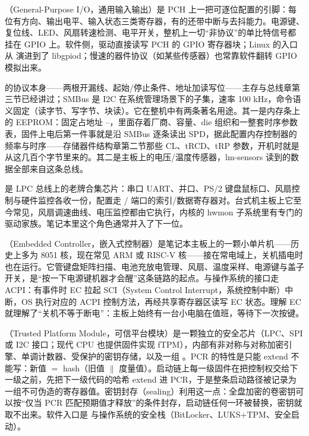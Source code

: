 （General-Purpose I/O，通用输入输出）是 PCH 上一把可逐位配置的引脚：每位有方向、输出电平、输入状态三类寄存器，有的还带中断与去抖能力。电源键、复位线、LED、风扇转速检测、电平开关，整机上一切“非协议”的单比特信号都挂在 GPIO 上。软件侧，驱动直接读写 PCH 的 GPIO 寄存器块；Linux 的入口从  演进到了 libgpiod；慢速的器件协议（如某些传感器）也常靠软件翻转 GPIO 模拟出来。

 的协议本身——两根开漏线、起始/停止条件、地址加读写位——主存与总线章第三节已经讲过；SMBus 是 I2C 在系统管理场景下的子集，速率 100 kHz，命令语义固定（读字节、写字节、块读）。它在整机中有两条著名用途。其一是内存条上的  EEPROM：固定占地址 --，里面存着厂商、容量、die 组织和一整套时序参数表，固件上电后第一件事就是沿 SMBus 逐条读出 SPD，据此配置内存控制器的频率与时序——存储器件结构章第二节那些 CL、tRCD、tRP 参数，开机时就是从这几百个字节里来的。其二是主板上的电压/温度传感器，lm-sensors 读到的数据全部来自这条总线。

 是 LPC 总线上的老牌合集芯片：串口 UART、并口、PS/2 键盘鼠标口、风扇控制与硬件监控各收一份，配置走 / 端口的索引/数据寄存器对。台式机主板上它至今常见，风扇调速曲线、电压监控都由它执行，内核的 hwmon 子系统里有专门的驱动家族。笔记本里这个角色通常并入了下一位。

（Embedded Controller，嵌入式控制器）是笔记本主板上的一颗小单片机——历史上多为 8051 核，现在常见 ARM 或 RISC-V 核——接在常电域上，关机插电时也在运行。它管键盘矩阵扫描、电池充放电管理、风扇、温度采样、电源键与盖子开关，是“按一下电源键机器才会醒”这条链路的起点。与操作系统的接口走 ACPI：有事件时 EC 拉起 SCI（System Control Interrupt，系统控制中断）中断，OS 执行对应的 ACPI 控制方法，再经共享寄存器区读写 EC 状态。理解 EC 就理解了“关机不等于断电”：主板上始终有一台小电脑在值班，等待下一次按键。

（Trusted Platform Module，可信平台模块）是一颗独立的安全芯片（LPC、SPI 或 I2C 接口；现代 CPU 也提供固件实现 fTPM），内部有非对称与对称加密引擎、单调计数器、受保护的密钥存储，以及一组 。PCR 的特性是只能 extend 不能写：新值 $=$ hash（旧值 $\|$ 度量值）。启动链上每一级固件在把控制权交给下一级之前，先把下一级代码的哈希 extend 进 PCR，于是整条启动路径被记录为一组不可伪造的寄存器值。密钥封存（sealing）利用这一点：全盘加密的卷密钥可以按“仅当 PCR 匹配预期值才释放”的条件封存，启动链任何一环被替换，密钥就取不出来。软件入口是  与操作系统的安全栈（BitLocker、LUKS+TPM、安全启动）。

